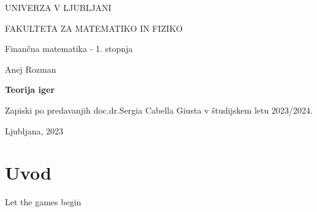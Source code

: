 \documentclass[a4paper,12pt]{article}
\begin{document}
\begin{titlepage}
    UNIVERZA V LJUBLJANI
  
    FAKULTETA ZA MATEMATIKO IN FIZIKO
  
    \vspace{0.5cm}
    Finančna matematika - 1. stopnja
  
    \begin{center}
        \vspace{7cm}
            Anej Rozman
  
        \vspace{0.4cm}
        \textbf{\Large{Teorija iger}}
        \vspace{0.3cm}
  
        Zapiski po predavanjih doc.\@ dr.\@ Sergia Cabella Giusta v študijskem letu 2023/2024.
    \end{center}
    \vfill
        Ljubljana, 2023     
    \thispagestyle{empty}
\end{titlepage}

\newpage
  
\tableofcontents
   
\newpage
    
\section*{Uvod}
Let the games begin
\end{document}
